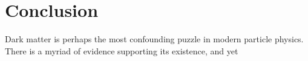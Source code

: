 
\chapter{Conclusion}
\label{chapter:conclusion}

  

Dark matter is perhaps the most confounding puzzle in modern particle physics. There is a myriad of evidence supporting its existence, and yet 